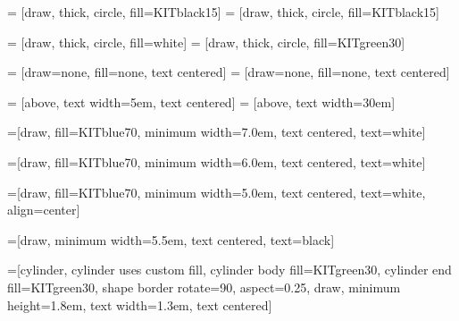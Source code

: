 




 = [draw, thick, circle, fill=KITblack15]
 = [draw, thick, circle, fill=KITblack15]

 = [draw, thick, circle, fill=white]
 = [draw, thick, circle, fill=KITgreen30]

 = [draw=none, fill=none, text centered]
 = [draw=none, fill=none, text centered]

 = [above, text width=5em, text centered]
 = [above, text width=30em]

=[draw, fill=KITblue70, minimum width=7.0em, text centered, 
	text=white]

=[draw, fill=KITblue70, minimum width=6.0em, text centered, 
	text=white]

=[draw, fill=KITblue70, minimum width=5.0em, text centered, 
	text=white, align=center]

=[draw, minimum width=5.5em, text centered, 
	text=black]

=[cylinder, cylinder uses custom fill, cylinder body 
		fill=KITgreen30, cylinder end fill=KITgreen30, shape border rotate=90,
		aspect=0.25, draw, minimum height=1.8em, text width=1.3em, text centered]

